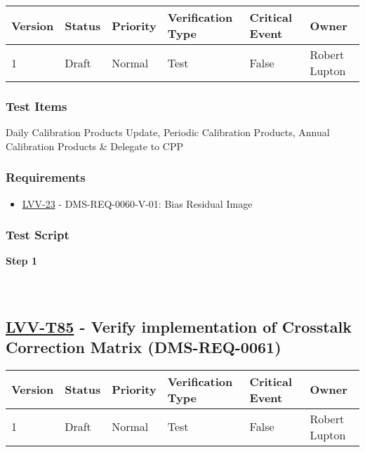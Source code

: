 \begin{longtable}[]{@{}llllll@{}}
\toprule
Version & Status & Priority & Verification Type & Critical Event &
Owner\tabularnewline
\midrule
\endhead
1 & Draft & Normal & Test & False & Robert Lupton\tabularnewline
\bottomrule
\end{longtable}

\hypertarget{test-items-60}{%
\subsubsection{Test Items}\label{test-items-60}}

Daily Calibration Products Update, Periodic Calibration Products, Annual
Calibration Products \& Delegate to CPP

\hypertarget{requirements-61}{%
\subsubsection{Requirements}\label{requirements-61}}

\begin{itemize}
\tightlist
\item
  \href{https://jira.lsstcorp.org/browse/LVV-23}{LVV-23} -
  DMS-REQ-0060-V-01: Bias Residual Image
\end{itemize}

\hypertarget{test-script-61}{%
\subsubsection{Test Script}\label{test-script-61}}

\textbf{Step 1}\\
~\\
~\\

\hypertarget{lvv-t85---verify-implementation-of-crosstalk-correction-matrix-dms-req-0061}{%
\subsection{\texorpdfstring{\href{https://jira.lsstcorp.org/secure/Tests.jspa\#/testCase/LVV-T85}{LVV-T85}
- Verify implementation of Crosstalk Correction Matrix
(DMS-REQ-0061)}{LVV-T85 - Verify implementation of Crosstalk Correction Matrix (DMS-REQ-0061)}}\label{lvv-t85---verify-implementation-of-crosstalk-correction-matrix-dms-req-0061}}

\begin{longtable}[]{@{}llllll@{}}
\toprule
Version & Status & Priority & Verification Type & Critical Event &
Owner\tabularnewline
\midrule
\endhead
1 & Draft & Normal & Test & False & Robert Lupton\tabularnewline
\bottomrule
\end{longtable}

